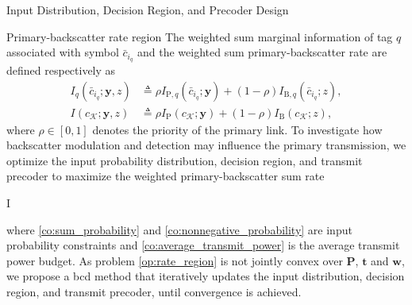 \documentclass[journal]{IEEEtran}
\begin{document}
	\begin{section}{Input Distribution, Decision Region, and Precoder Design}
		\begin{subsection}{Primary-backscatter rate region}
			The weighted sum marginal information of tag $q$ associated with symbol $\bar{c}_{i_q}$ and the weighted sum primary-backscatter rate are defined respectively as
			\begin{align}
				I_q(\bar{c}_{i_q};\boldsymbol{y},z)
				& \triangleq \rho I_{\mathrm{P},q}(\bar{c}_{i_q};\boldsymbol{y}) + (1 - \rho) I_{\mathrm{B},q}(\bar{c}_{i_q};z),\label{eq:weighted_sum_marginal_information}\\
				I(c_{\mathcal{K}};\boldsymbol{y},z)
				& \triangleq \rho I_{\mathrm{P}}(c_{\mathcal{K}};\boldsymbol{y}) + (1 - \rho) I_{\mathrm{B}}(c_{\mathcal{K}};z),\label{eq:weighted_sum_rate}
			\end{align}
			where $\rho \in [0,1]$ denotes the priority of the primary link. To investigate how backscatter modulation and detection may influence the primary transmission, we optimize the input probability distribution, decision region, and transmit precoder to maximize the weighted primary-backscatter sum rate
			\begin{maxi!}
				{}{I}{\label{op:rate_region}}{\label{ob:weighted_sum_rate}}
			\end{maxi!}
			where \eqref{co:sum_probability} and \eqref{co:nonnegative_probability} are input probability constraints and \eqref{co:average_transmit_power} is the average transmit power budget. As problem \eqref{op:rate_region} is not jointly convex over $\boldsymbol{P}$, $\boldsymbol{t}$ and $\boldsymbol{w}$, we propose a \gls{bcd} method that iteratively updates the input distribution, decision region, and transmit precoder, until convergence is achieved.
		\end{subsection}


\end{section}
\end{document}

